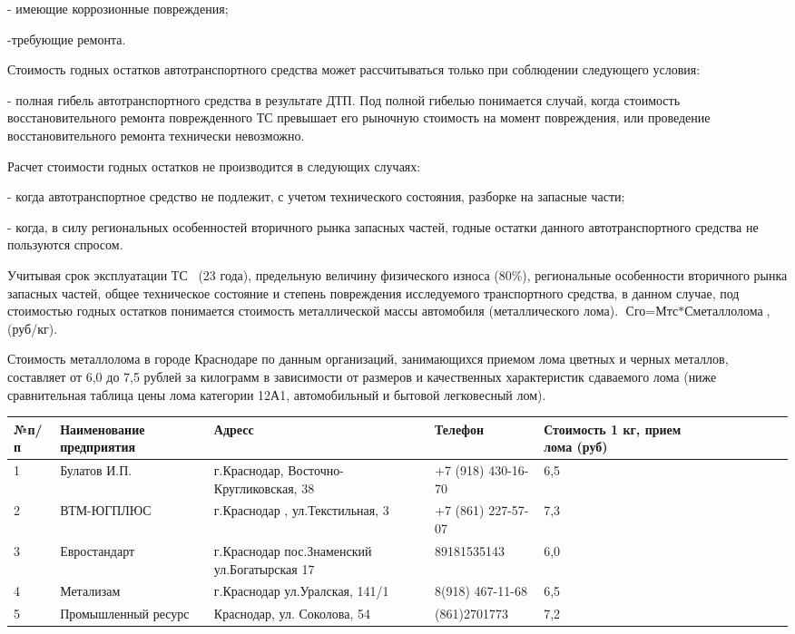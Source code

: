 - имеющие коррозионные повреждения;

-требующие ремонта.


Стоимость годных остатков автотранспортного средства может рассчитываться только при соблюдении следующего условия: 

- полная гибель автотранспортного средства в результате ДТП. Под полной гибелью понимается случай, когда стоимость восстановительного ремонта поврежденного ТС превышает его рыночную стоимость на момент повреждения, или проведение восстановительного ремонта технически невозможно.
 
Расчет стоимости годных остатков не производится в следующих случаях:

- когда автотранспортное средство не подлежит, с учетом технического состояния, разборке на запасные части;

- когда, в силу региональных особенностей вторичного  рынка запасных частей, годные остатки данного автотранспортного средства не пользуются спросом.

Учитывая срок эксплуатации ТС  \, (23 года), предельную величину физического износа (80\%), региональные особенности вторичного рынка запасных частей, общее техническое состояние и  степень повреждения исследуемого транспортного средства,  в данном случае,   под стоимостью годных остатков понимается стоимость металлической массы автомобиля (металлического лома).
 $  \text{Сго} = \text{Мтс*Сметаллолома}  $, (руб/кг).
 
Стоимость металлолома в городе Краснодаре по данным организаций, занимающихся  приемом лома цветных и черных металлов, составляет от 6,0 до 7,5 рублей за килограмм в зависимости от размеров и качественных характеристик сдаваемого лома (ниже сравнительная таблица цены лома категории 12А1, автомобильный и бытовой легковесный лом). 


\begin{table}[H]
	
\begin{tabular}{|p{8mm}|l|p{26mm}|l|p{32mm}|l|p{18mm}|l|p{10mm}|c|p{8mm}}
	\hline 
№п/п	& {\small Наименование  предприятия} &{\small Адресс } &{\small Телефон}  & 	{\small Стоимость 1 кг, прием лома (руб)} \\
	\hline 
{\small 1}	& {\small Булатов И.П.} &{\small г.Краснодар,  Восточно-Кругликовская, 38 } &	{\small +7 (918) 430-16-70}  & {\small 6,5} \\ 
	\hline 
{\small 2}	&{\small  ВТМ-ЮГПЛЮС} &	{\small г.Краснодар , ул.Текстильная, 3 } &{\small +7 (861) 227-57-07 }&{\small  7,3 }\\ 
	\hline 
{\small 3}	&{\small Евростандарт } &{\small г.Краснодар пос.Знаменский ул.Богатырская 17}  &{\small 89181535143}  & {\small 6,0} \\ 
	\hline 
{\small 4}	& {\small Метализам} & {\small г.Краснодар ул.Уралская, 141/1} &	 {\small 8(918) 467-11-68 } & {\small 	6,5} \\ 
	\hline 
{\small 5}	& {\small Промышленный ресурс} & {\small Краснодар, ул. Соколова, 54}	 &{\small (861)2701773 } & {\small 	7,2 }\\ 
	\hline
\end{tabular} 

\end{table}
		

